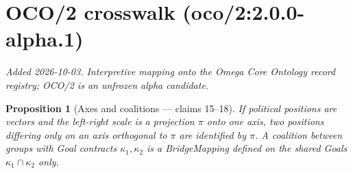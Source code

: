 \documentclass[11pt,a4paper]{article}
\newtheorem{proposition}[definition]{Proposition}
\begin{document}
\section{OCO/2 crosswalk (oco/2:2.0.0-alpha.1)}
\emph{Added 2026-10-03. Interpretive mapping onto the Omega Core Ontology
record registry; OCO/2 is an unfrozen alpha candidate.}

\begin{proposition}[Axes and coalitions --- claims 15--18]
If political positions are vectors and the left-right scale is a projection $\pi$ onto one axis, two positions differing only on an axis orthogonal to $\pi$ are identified by $\pi$. A coalition between groups with Goal contracts $\kappa_1,\kappa_2$ is a BridgeMapping defined on the shared Goals $\kappa_1\cap\kappa_2$ only.
\end{proposition}
\end{document}
